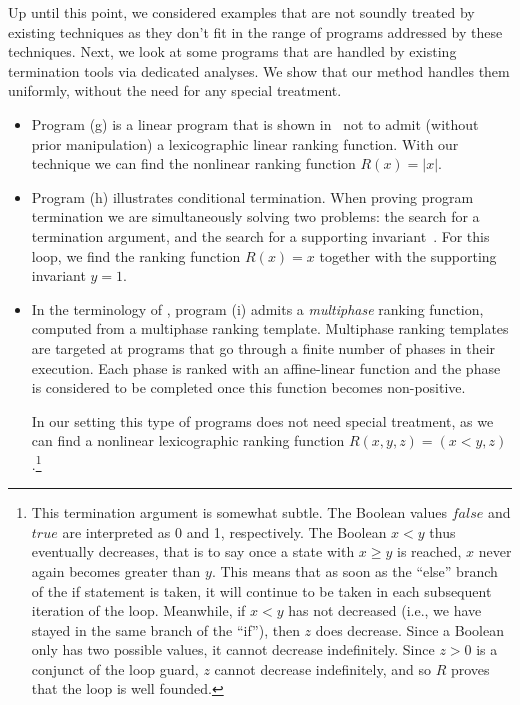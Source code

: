 \documentclass[preprint]{sigplanconf}
\theoremstyle{definition}
\begin{document}
Up until this point, we considered examples that are not soundly treated by
existing techniques as they don't fit in the range of programs addressed by
these techniques.  Next, we look at some programs that are handled by
existing termination tools via dedicated analyses.  We show that our method
handles them uniformly, without the need for any special treatment.
%
\begin{itemize}

\item Program (g) is a linear program that is shown
in~\cite{DBLP:conf/tacas/CookSZ13} not to admit (without prior manipulation)
a lexicographic linear ranking function.  With our technique we can find the
nonlinear ranking function $R(x) = |x|$.


\item Program (h) illustrates conditional termination.  When proving program
termination we are simultaneously solving two problems: the search for a
termination argument, and the search for a supporting
invariant~\cite{DBLP:conf/cav/BrockschmidtCF13}.  For this loop, we find the
ranking function $R(x) = x$ together with the supporting invariant $y=1$.

\item In the terminology of \cite{DBLP:conf/tacas/LeikeH14}, program (i)
admits a \emph{multiphase} ranking function, computed from a multiphase
ranking template.  Multiphase ranking templates are targeted at programs
that go through a finite number of phases in their execution.  Each phase is
ranked with an affine-linear function and the phase is considered to be
completed once this function becomes non-positive.

In our setting this type of programs does not need special treatment, as we
can find a nonlinear lexicographic ranking function $R(x, y, z) = (x < y,
z)$.\footnote{This termination argument is somewhat subtle.  The Boolean
values $\mathit{false}$ and $\mathit{true}$ are interpreted as 0 and 1,
respectively.  The Boolean $x < y$ thus eventually decreases, that is to say
once a state with $x \geq y$ is reached, $x$ never again becomes greater
than $y$.  This means that as soon as the ``else'' branch of the if
statement is taken, it will continue to be taken in each subsequent
iteration of the loop.  Meanwhile, if $x < y$ has not decreased (i.e., we
have stayed in the same branch of the ``if''), then $z$ does decrease. 
Since a Boolean only has two possible values, it cannot decrease
indefinitely.  Since $z > 0$ is a conjunct of the loop guard, $z$ cannot
decrease indefinitely, and so $R$ proves that the loop is well founded.}


\end{itemize}
\end{document}
